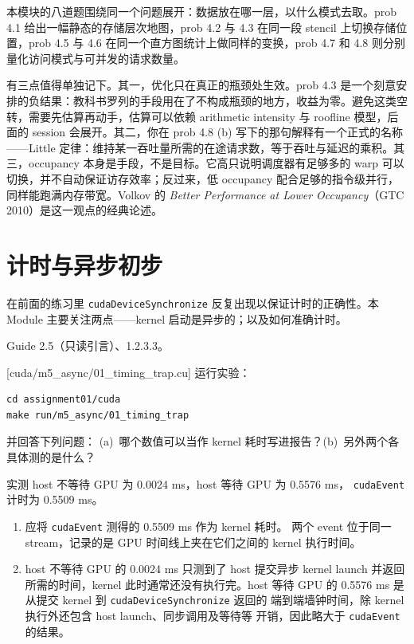 \documentclass[11pt,a4paper,fontset=none]{ctexart}
\begin{document}
\begin{lookback}
  本模块的八道题围绕同一个问题展开：数据放在哪一层，以什么模式去取。prob 4.1 给出一幅静态的存储层次地图，prob 4.2 与 4.3 在同一段 stencil 上切换存储位置，prob 4.5 与 4.6 在同一个直方图统计上做同样的变换，prob 4.7 和 4.8 则分别量化访问模式与可并发的请求数量。

  有三点值得单独记下。其一，优化只在真正的瓶颈处生效。prob 4.3 是一个刻意安排的负结果：教科书罗列的手段用在了不构成瓶颈的地方，收益为零。避免这类空转，需要先估算再动手，估算可以依赖 arithmetic intensity 与 roofline 模型，后面的 session 会展开。其二，你在 prob 4.8 (b) 写下的那句解释有一个正式的名称——Little 定律：维持某一吞吐量所需的在途请求数，等于吞吐与延迟的乘积。其三，occupancy 本身是手段，不是目标。它高只说明调度器有足够多的 warp 可以切换，并不自动保证访存效率；反过来，低 occupancy 配合足够的指令级并行，同样能跑满内存带宽。Volkov 的 \textit{Better Performance at Lower Occupancy}（GTC 2010）是这一观点的经典论述。
\end{lookback}

\section{计时与异步初步}

在前面的练习里 \texttt{cudaDeviceSynchronize} 反复出现以保证计时的正确性。本 Module 主要关注两点——kernel 启动是异步的；以及如何准确计时。

\begin{reading}
  Guide 2.5（只读引言）、1.2.3.3。
\end{reading}

[cuda/m5\_async/01\_timing\_trap.cu]
运行实验：

\begin{lstlisting}
cd assignment01/cuda
make run/m5_async/01_timing_trap
\end{lstlisting}

并回答下列问题：
(a)~哪个数值可以当作 kernel 耗时写进报告？(b)~另外两个各具体测的是什么？

实测 host 不等待 GPU 为 0.0024 ms，host 等待 GPU 为 0.5576 ms，
\texttt{cudaEvent} 计时为 0.5509 ms。

\begin{enumerate}[label=(\alph*)]
  \item 应将 \texttt{cudaEvent} 测得的 0.5509 ms 作为 kernel 耗时。
        两个 event 位于同一 stream，记录的是 GPU 时间线上夹在它们之间的
        kernel 执行时间。
  \item host 不等待 GPU 的 0.0024 ms 只测到了 host 提交异步 kernel
        launch 并返回所需的时间，kernel 此时通常还没有执行完。host 等待 GPU
        的 0.5576 ms 是从提交 kernel 到 \texttt{cudaDeviceSynchronize} 返回的
        端到端墙钟时间，除 kernel 执行外还包含 host launch、同步调用及等待等
        开销，因此略大于 \texttt{cudaEvent} 的结果。
\end{enumerate}
\end{document}
